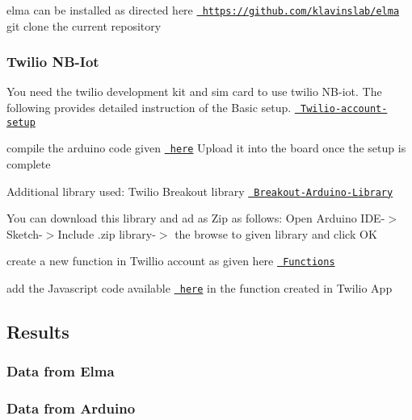 elma can be installed as directed here \href{https://github.com/klavinslab/elma}{\texttt{ https\+://github.\+com/klavinslab/elma}} git clone the current repository


\begin{DoxyCode}{0}
\end{DoxyCode}


\subsubsection*{Twilio N\+B-\/\+Iot}

You need the twilio development kit and sim card to use twilio N\+B-\/iot. The following provides detailed instruction of the Basic setup. \href{https://www.twilio.com/docs/wireless/tutorials/apn-configuration}{\texttt{ Twilio-\/account-\/setup}}

compile the arduino code given \href{https://github.com/ForumSuthar/SmsUpdates/tree/master/arduino}{\texttt{ here}} Upload it into the board once the setup is complete

Additional library used\+: Twilio Breakout library \href{https://github.com/twilio/Breakout_Arduino_Library}{\texttt{ Breakout-\/\+Arduino-\/\+Library}}

You can download this library and ad as Zip as follows\+: Open Arduino I\+D\+E-\/$>$ Sketch-\/$>$Include .zip library-\/$>$ the browse to given library and click OK

create a new function in Twillio account as given here \href{https://www.twilio.com/docs/runtime/functions}{\texttt{ Functions}}

add the Javascript code available \href{https://github.com/ForumSuthar/SmsUpdates/tree/master/Twilio}{\texttt{ here}} in the function created in Twilio App

\subsection*{Results}

\subsubsection*{Data from Elma}



\subsubsection*{Data from Arduino}



